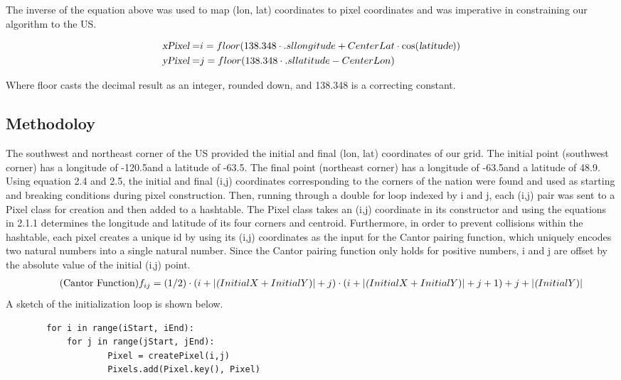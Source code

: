 The inverse of the equation above was used to map (lon, lat) coordinates to pixel coordinates and 
was imperative in constraining our algorithm to the US. 

\begin{align}
 \textsl{xPixel} = & i = floor(138.348 \cdot \text.sl{longitude + CenterLat} \cdot \cos(\textsl{latitude})) \\
  \textsl{yPixel} = & j = floor(138.348 \cdot \text.sl{latitude - CenterLon})
\end{align}

Where floor casts the decimal result as an integer, rounded down, and 138.348 is a correcting constant. 
\subsection{Methodoloy}

The southwest and northeast corner of the US provided the initial and final (lon, lat) 
coordinates of our grid. The initial point (southwest corner) has a longitude of  -120.5\textdegree and a latitude of -63.5\textdegree. The final point (northeast corner) has a longitude of -63.5\textdegree and a latitude of 48.9\textdegree. Using equation 2.4 and 2.5, the initial and final (i,j) coordinates corresponding to the corners of the nation were found and used as starting and breaking conditions during pixel construction. Then, running through a double for loop indexed by i and j, each (i,j) pair was sent to a Pixel class for creation and then added to a hashtable. The Pixel class takes an (i,j) coordinate in its constructor and using the equations in 2.1.1 determines the longitude and latitude of its four corners and centroid. Furthermore, in order to prevent collisions within the hashtable, each pixel creates a unique id by using its (i,j) coordinates as the input for the Cantor pairing function, which uniquely encodes two natural numbers into a single natural number. Since the Cantor pairing function only holds for positive numbers, i and j are offset by the absolute value of the initial (i,j) point.
\begin{multline*}
\label{eq: Cantor Function}
\tag{Cantor Function}
f_{ij} = (1/2) \cdot (i + |\textsl(InitialX + Initial Y)| + j ) \cdot (i + |\textsl(InitialX + Initial Y)| + j + 1) + j + |\textsl(InitialY)| 
\end{multline*}
A sketch of the initialization loop is shown below.
\begin{verbatim}
        for i in range(iStart, iEnd): 
          	for j in range(jStart, jEnd):
                    Pixel = createPixel(i,j)
                    Pixels.add(Pixel.key(), Pixel)
\end{verbatim}

